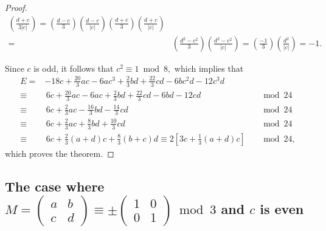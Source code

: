 \documentclass[12pt]{article}
\theoremstyle{definition}
\numberwithin{equation}{section}
\numberwithin{theorem}{section}
\begin{document}
\begin{proof}
\begin{align*}
\left(
\frac{d+c}{3 |c|}
\right)=
\left(
\frac{d-c}{3}
\right)
\left(
\frac{d-c}{ |c|}
\right) 
\left(
\frac{d+c}{3}
\right)
\left(
\frac{d+c}{ |c|}
\right)  \\
=&\left(
\frac{d^2-c^2}{3}
\right)
\left(
\frac{d^2-c^2}{ |c|}
\right) 
=
\left(
\frac{-1}{3}
\right)
\left(
\frac{d^2}{ |c|}
\right) 
=-1. 
\end{align*} 
\par
Since $c$ is odd, 
it follows that 
$c^2\equiv 1 \bmod{8},$ 
which implies that 
\begin{align*}
E=&-18 c + \frac{20}{3} a c - 6 a c^3 + \frac23 b d + \frac{22}{3} c d - 6 b c^2 d - 
 12 c^3 d & \\
\equiv & \,
6 c + \frac{20}{3} a c - 6 a c + \frac23 b d + \frac{22}{3} c d - 6 b d - 
 12 c d  &  &\bmod{24}  \\
\equiv &\, 
6 c + \frac{2}{3} a c - \frac{16}3 b d - \frac{14}{3} c d &  &\bmod{24}  \\
\equiv &
\, 
6c+\frac{2}{3}ac
+\frac{8}{3}bd+\frac{10}{3}cd  &  &\bmod{24}  \\
\equiv &\,
6c+\frac{2}{3}(a+d)c
+\frac{8}{3}(b+c)d
\equiv
2
\left[
3c+\frac13(a+d)c
\right]    &  &\bmod{24},
\end{align*}
which proves the theorem. 
\end{proof}













\subsection{The case where 
$
M
=
\begin{pmatrix}
a & b \\
c & d
\end{pmatrix}
\equiv \pm
\begin{pmatrix}
1 & 0 \\
0 & 1
\end{pmatrix} 
\bmod{3}
$ 
and 
$c$ is even
}
\end{document}
